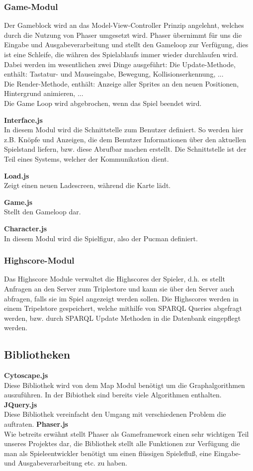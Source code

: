 \documentclass[11pt,a4paper]{article}
\begin{document}
\subsubsection{Game-Modul}
Der Gameblock wird an das Model-View-Controller Prinzip angelehnt, welches durch die Nutzung von Phaser umgesetzt wird. 
Phaser übernimmt für uns die Eingabe und Ausgabeverarbeitung und stellt den Gameloop zur Verfügung, dies ist eine Schleife, die währen des Spielablaufs immer wieder durchlaufen wird.
Dabei werden im wesentlichen zwei Dinge ausgeführt:
Die Update-Methode, enthält: Tastatur- und Mauseingabe, Bewegung, Kollisionserkennung, ... \\
Die Render-Methode, enthält: Anzeige aller Sprites an den neuen Positionen, Hintergrund animieren, ... \\
Die Game Loop wird abgebrochen, wenn das Spiel beendet wird.
\par\bigskip
{\flushleft \textbf{Interface.js}} \\
In diesem Modul wird die Schnittstelle zum Benutzer definiert.
So werden hier z.B. Knöpfe und Anzeigen, die dem Benutzer Informationen über den aktuellen Spielstand liefern, bzw. diese Abrufbar machen erstellt.
Die Schnittstelle ist der Teil eines Systems, welcher der Kommunikation dient. \par\bigskip
{\flushleft \textbf{Load.js}} \\
Zeigt einen neuen Ladescreen, während die Karte lädt. \par\bigskip
{\flushleft \textbf{Game.js}} \\
Stellt den Gameloop dar. \par\bigskip
{\flushleft\textbf{Character.js}} \\
In diesem Modul wird die Spielfigur, also der Pucman definiert.

\subsubsection{Highscore-Modul}
Das Highscore Module verwaltet die Highscores der Spieler, d.h. es stellt Anfragen an den Server zum Triplestore und kann sie über den Server auch abfragen, falls sie im Spiel angezeigt werden sollen.
Die Highscores werden in einem Tripelstore gespeichert, welche mithilfe von SPARQL Queries abgefragt werden, bzw. durch  SPARQL Update Methoden in die Datenbank eingepflegt werden.
\subsection{Bibliotheken}
{\flushleft \textbf{Cytoscape.js}} \\
Diese Bibliothek wird von dem Map Modul benötigt um die Graphalgorithmen auszuführen. In der Bibiothek sind bereits viele Algorithmen enthalten.
{\flushleft \textbf{JQuery.js}} \\
Diese Bibliothek vereinfacht den Umgang mit verschiedenen Problem die auftraten.
{\flushleft \textbf{Phaser.js}} \\
Wie betreits erwähnt stellt Phaser als Gameframework einen sehr wichtigen Teil unseres Projektes dar, die Bibliothek stellt alle Funktionen zur Verfügung die man als Spieleentwickler benötigt um einen flüssigen Spielefluß, eine Eingabe- und Ausgabeverarbeitung etc. 
zu haben. 
\end{document}
